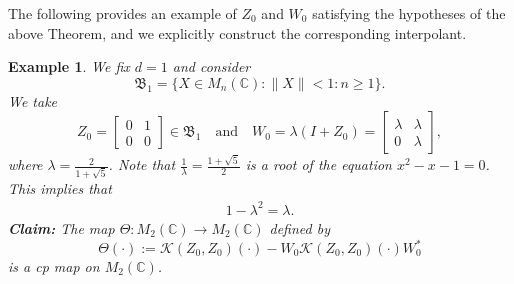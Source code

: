 \documentclass[12pt]{amsart}%
\newtheorem{example}[theorem]{Example}
\numberwithin{equation}{section}
\newcommand{\fB}{{\mathfrak{B}}}
\newcommand{\clk}{\mathcal{K}}
\newcommand{\C}{\mathbb{C}}
\begin{document}
The following provides an example of $Z_0$ and $W_0$ satisfying the hypotheses of the above Theorem, and we explicitly construct the corresponding interpolant.
\begin{example}
We fix $d=1$ and consider
\[\fB_1=\{X\in M_n(\C): \|X\|<1: n\geq 1 \}.\]
We take 
\[Z_0=\begin{bmatrix} 0 & 1 \\ 0 & 0 \end{bmatrix}\in \fB_1 \quad \text{and}\quad   W_0 = \lambda(I+Z_0) = \begin{bmatrix} \lambda & \lambda \\ 0 & \lambda \end{bmatrix},\]
where $\lambda=\frac{2}{1+\sqrt{5}}$. Note that $\frac{1}{\lambda}=\frac{1+\sqrt{5}}{2}$ is a root of the equation $x^2-x-1=0$. This implies that 
\begin{align}\label{gold_id}
1-\lambda^2=\lambda.
\end{align}
\textbf{Claim:} The map $\Theta: M_2(\C) \to M_2(\C)$ defined by 
\[
\Theta(\cdot):=\clk(Z_0, Z_0)(\cdot)-W_0 \clk(Z_0, Z_0)(\cdot) W_0^* 
\]
is a \textit{cp} map on $M_2(\C)$.


\end{example}
\end{document}
